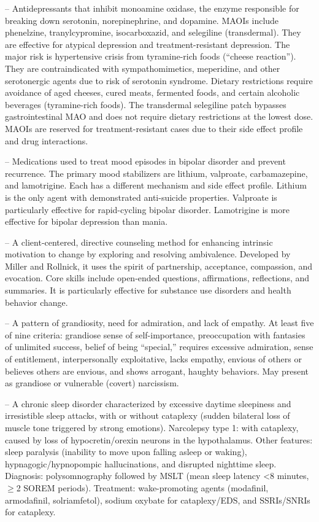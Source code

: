 -- Antidepressants that inhibit monoamine oxidase, the enzyme responsible for breaking down serotonin, norepinephrine, and dopamine. MAOIs include phenelzine, tranylcypromine, isocarboxazid, and selegiline (transdermal). They are effective for atypical depression and treatment-resistant depression. The major risk is hypertensive crisis from tyramine-rich foods (``cheese reaction''). They are contraindicated with sympathomimetics, meperidine, and other serotonergic agents due to risk of serotonin syndrome. Dietary restrictions require avoidance of aged cheeses, cured meats, fermented foods, and certain alcoholic beverages (tyramine-rich foods). The transdermal selegiline patch bypasses gastrointestinal MAO and does not require dietary restrictions at the lowest dose. MAOIs are reserved for treatment-resistant cases due to their side effect profile and drug interactions.

-- Medications used to treat mood episodes in bipolar disorder and prevent recurrence. The primary mood stabilizers are lithium, valproate, carbamazepine, and lamotrigine. Each has a different mechanism and side effect profile. Lithium is the only agent with demonstrated anti-suicide properties. Valproate is particularly effective for rapid-cycling bipolar disorder. Lamotrigine is more effective for bipolar depression than mania.

-- A client-centered, directive counseling method for enhancing intrinsic motivation to change by exploring and resolving ambivalence. Developed by Miller and Rollnick, it uses the spirit of partnership, acceptance, compassion, and evocation. Core skills include open-ended questions, affirmations, reflections, and summaries. It is particularly effective for substance use disorders and health behavior change.

-- A pattern of grandiosity, need for admiration, and lack of empathy. At least five of nine criteria: grandiose sense of self-importance, preoccupation with fantasies of unlimited success, belief of being ``special,'' requires excessive admiration, sense of entitlement, interpersonally exploitative, lacks empathy, envious of others or believes others are envious, and shows arrogant, haughty behaviors. May present as grandiose or vulnerable (covert) narcissism.

-- A chronic sleep disorder characterized by excessive daytime sleepiness and irresistible sleep attacks, with or without cataplexy (sudden bilateral loss of muscle tone triggered by strong emotions). Narcolepsy type 1: with cataplexy, caused by loss of hypocretin/orexin neurons in the hypothalamus. Other features: sleep paralysis (inability to move upon falling asleep or waking), hypnagogic/hypnopompic hallucinations, and disrupted nighttime sleep. Diagnosis: polysomnography followed by MSLT (mean sleep latency <8 minutes, \(\ge\)2 SOREM periods). Treatment: wake-promoting agents (modafinil, armodafinil, solriamfetol), sodium oxybate for cataplexy/EDS, and SSRIs/SNRIs for cataplexy.

